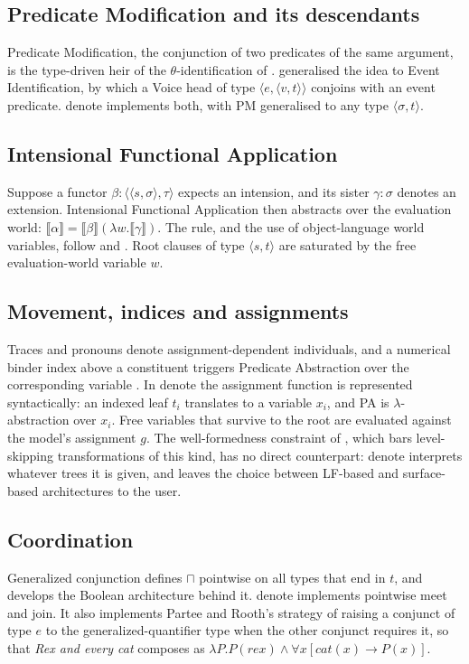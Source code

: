\documentclass[11pt,a4paper]{article}
\newcommand{\den}[1]{\llbracket #1\rrbracket}
\newcommand{\dn}{\textsf{denote}}
\newcommand{\ty}[1]{\langle #1\rangle}
\theoremstyle{definition}
\begin{document}
\subsection{Predicate Modification and its descendants}
Predicate Modification, the conjunction of two predicates of the same argument, is the type-driven heir of the $\theta$-identification of \citet{higginbotham1985}. \citet{kratzer1996} generalised the idea to Event Identification, by which a Voice head of type $\ty{e,\ty{v,t}}$ conjoins with an event predicate. \dn{} implements both, with PM generalised to any type $\ty{\sigma,t}$.

\subsection{Intensional Functional Application}
Suppose a functor $\beta:\ty{\ty{s,\sigma},\tau}$ expects an intension, and its sister $\gamma:\sigma$ denotes an extension. Intensional Functional Application then abstracts over the evaluation world: $\den{\alpha}=\den{\beta}(\lambda w.\den{\gamma})$. The rule, and the use of object-language world variables, follow \citet[ch.~12]{heimkratzer1998} and \citet{vonfintelheim2011}. Root clauses of type $\ty{s,t}$ are saturated by the free evaluation-world variable $w$.

\subsection{Movement, indices and assignments}
Traces and pronouns denote assignment-dependent individuals, and a numerical binder index above a constituent triggers Predicate Abstraction over the corresponding variable \citep[chs.~5, 7, 9]{heimkratzer1998}. In \dn{} the assignment function is represented syntactically: an indexed leaf $t_i$ translates to a variable $x_i$, and PA is $\lambda$-abstraction over $x_i$. Free variables that survive to the root are evaluated against the model's assignment $g$. The well-formedness constraint of \citet{partee1979wfc}, which bars level-skipping transformations of this kind, has no direct counterpart: \dn{} interprets whatever trees it is given, and leaves the choice between LF-based and surface-based architectures to the user.

\subsection{Coordination}
Generalized conjunction \citep{parteerooth1983} defines $\sqcap$ pointwise on all types that end in $t$, and \citet{winter2001} develops the Boolean architecture behind it. \dn{} implements pointwise meet and join. It also implements Partee and Rooth's strategy of raising a conjunct of type $e$ to the generalized-quantifier type when the other conjunct requires it, so that \textit{Rex and every cat} composes as $\lambda P.P(\textit{rex})\wedge\forall x[\textit{cat}(x)\to P(x)]$.
\end{document}
